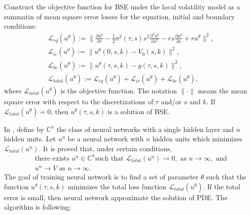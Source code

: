 \documentclass[11pt,reqno]{article}
\numberwithin{equation}{section}
\begin{document}
{Construct the objective function for BSE under the local volatility model
as a summatin of mean square error losses for the equation, initial and boundary conditions:
\begin{equation}\label{eqn:31}
\begin{aligned}
    &\mathcal{L}_{eq}(u^\theta) :=
    \Big\lVert
    \frac{\partial u^\theta}{\partial \tau}
    - \frac{1}{2}\sigma^2(\tau,s)s^2\frac{\partial^2 u^\theta}{\partial s^2}
    - rs\frac{\partial u^\theta}{\partial s}
    + ru^\theta    \Big\rVert^2,\\
    &\mathcal{L}_{ic}(u^\theta) := 
    \lVert
    u^\theta(0,s,k) - V_0(s,k)
    \rVert^2, \\ %
    &\mathcal{L}_{bc}(u^\theta) :=
    \lVert
    u^\theta(\tau,s,k) - g(\tau,s,k)
    \rVert^2,\\ %
    &\mathcal{L}_{total}(u^\theta) := 
    \mathcal{L}_{eq}(u^\theta) + \mathcal{L}_{ic}(u^\theta) + \mathcal{L}_{bc}(u^\theta),
\end{aligned}
\end{equation}
where $\mathcal{L}_{total}(u^\theta)$ is the objective function.
The notation $\|\cdot\|$ means the mean square error with respect to 
the discretizations of $\tau$ and/or $s$ and $k$.
 If $\mathcal{L}_{total}(u^\theta)=0$, then $u^\theta(\tau,s,k)$ is a solution of BSE.
 
In \cite{cybenko1989approximation, sirignano2018dgm},
 define by $\mathbb{C}^n$ the class of neural networks with a single hidden layer and $n$ hidden units. Let $u^n$ be a neural network with $n$ hidden units which minimizes $\mathcal{L}_{total}(u^n)$. It is proved that, under certain conditions,
\begin{equation}\label{eqn:32}
\begin{aligned}
    &\text{there exists }u^n \in \mathbb{C}^n \text{such that } \mathcal{L}_{total}(u^n) \to 0, \text{ as } n \to \infty, \text{ and} \\
    &u^n \to V \text{ as } n \to \infty.
\end{aligned}
\end{equation}
The goal of training neural network is to find a set of parameter $\theta$ such that the function $u^\theta(\tau,s,k)$ minimizes the total loss function $\mathcal{L}_{total} (u^\theta)$. If the total error is small, then neural network approximate the solution of PDE. 
The algorithm is following:


}
\end{document}
